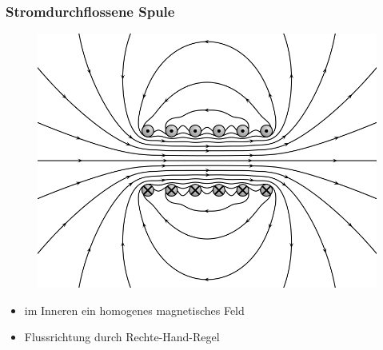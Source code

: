 \begin{frame}
  \frametitle{Stromdurchflossene Spule}
  \begin{center}
    \begin{figure}
      \includegraphics[width=\textwidth,height=.6\textheight,keepaspectratio]{e08/VFPt_cylindrical_coil_real.png}\\
    \end{figure}
    \begin{itemize}
      \item im Inneren ein homogenes magnetisches Feld
      \item Flussrichtung durch Rechte-Hand-Regel
    \end{itemize}
  \end{center}
\end{frame}

